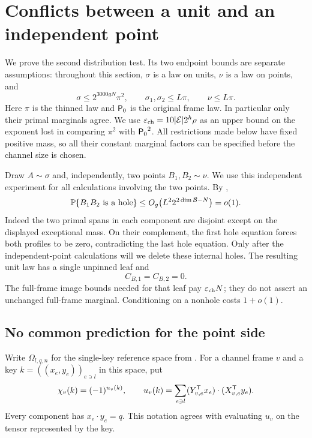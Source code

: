 \section{Conflicts between a unit and an independent point}
\label{sec:asymmetric}
\label{sec:asymmetric-test}

We prove the second distribution test.  Its two endpoint bounds are
separate assumptions: throughout this section, \(\sigma\) is a law
on units, \(\nu\) is a law on points, and
\begin{equation}
\label{eq:asym-caps}
 \sigma\le 2^{3000gN}\pi^2,
 \qquad \sigma_1,\sigma_2\le L\pi,
 \qquad \nu\le L\pi.
\end{equation}
Here \(\pi\) is the thinned law and \({\mathsf P_0}\) is the original
frame law.  In particular only their primal marginals agree.  We
use \(\varepsilon_{\rm ch}=10|\mathcal E|2^h\rho\) as an upper bound
on the exponent lost in comparing \(\pi^2\) with \({\mathsf P_0}^2\).
All restrictions made below have fixed positive mass, so all their
constant marginal factors can be specified before the channel size
is chosen.

Draw \(A\sim\sigma\) and, independently, two points
\(B_1,B_2\sim\nu\).  We use this independent experiment for all
calculations involving the two points.  By
,
\begin{equation}
\label{eq:asym-internal-hole}
 \mathbb P\{B_1B_2\text{ is a hole}\}
 \le O_g\bigl(L^2 2^{2\dim\mathcal B-N}\bigr)=o(1).
\end{equation}
Indeed the two primal spans in each component are disjoint except
on the displayed exceptional mass.  On their complement, the first
hole equation forces both profiles to be zero, contradicting the
last hole equation.  Only after the independent-point calculations
will we delete these internal holes.  The resulting unit law has a
single unpinned leaf and
\begin{equation}
\label{eq:asym-zero-space}
 C_{B,1}=C_{B,2}=0.
\end{equation}
The full-frame image bounds needed for that leaf pay
\(\varepsilon_{\rm ch}N\); they do not assert an unchanged
full-frame marginal.  Conditioning on a nonhole costs \(1+o(1)\).

\subsection{No common prediction for the point side}

Write \(\Omega_{l,q,n}\) for the single-key reference space from
.  For a channel frame \(v\) and a key
\(k=((x_e,y_e))_{e\ni l}\) in this space, put
\[
 \chi_v(k)=(-1)^{u_v(k)},\qquad
 u_v(k)=\sum_{e\ni l}
       (Y_{v,e}^{\mathsf T} x_e)\cdot(X_{v,e}^{\mathsf T} y_e).
\]
Every component has \(x_e\cdot y_e=q\).  This notation agrees
with evaluating \(u_v\) on the tensor represented by the key.

